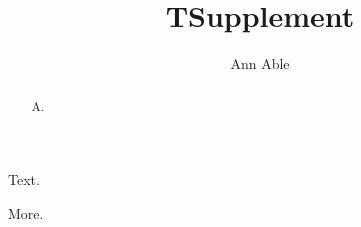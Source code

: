\documentclass[aps,prl]{revtex4-2}
\begin{document}
\title{T}
\author{Ann Able}
\begin{abstract}
A.
\end{abstract}
\maketitle
Text.
\title{Supplement}
\maketitle
More.
\end{document}
